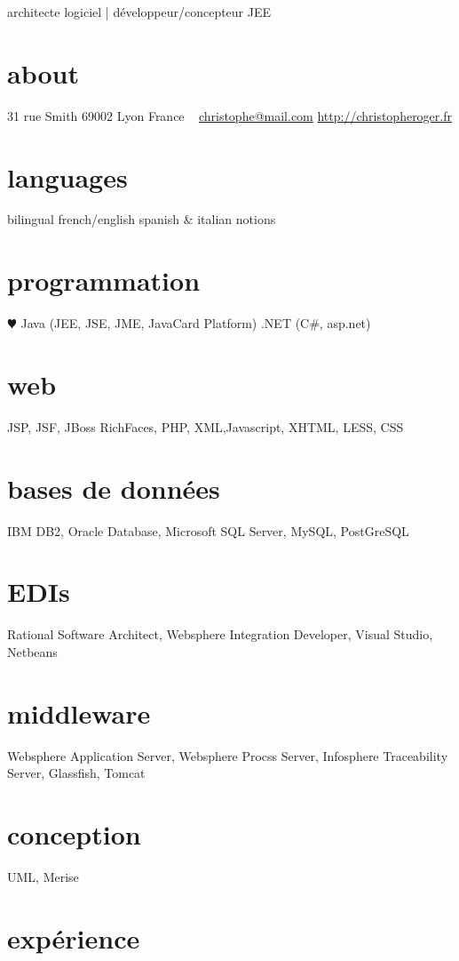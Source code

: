 \documentclass[]{roger-cv}
\begin{document}
       {architecte logiciel | développeur/concepteur JEE}


\begin{aside}
  \section{about}
    31 rue Smith
    69002 Lyon
    France
    ~
    \href{mailto:christophe@mail.com}{christophe@mail.com}
    \href{http://christopheroger.fr}{http://christopheroger.fr}
  \section{languages}
    bilingual french/english
    spanish \& italian notions
  \section{programmation}
    {\color{red} $\varheartsuit$} Java (JEE, JSE, JME, JavaCard Platform)
    .NET (C\#, asp.net)
  \section{web}
    {JSP, JSF, JBoss RichFaces, PHP, XML,Javascript, XHTML, LESS, CSS}
  \section{bases de données}
    {IBM DB2, Oracle Database, Microsoft SQL Server, MySQL, PostGreSQL}
  \section{EDIs}
    {Rational Software Architect, Websphere Integration Developer, Visual Studio, Netbeans}
  \section{middleware}
    {Websphere Application Server, Websphere Procss Server, Infosphere Traceability Server, Glassfish, Tomcat}
  \section{conception}
    {UML, Merise}
\end{aside}

\section{expérience}
\end{document}
